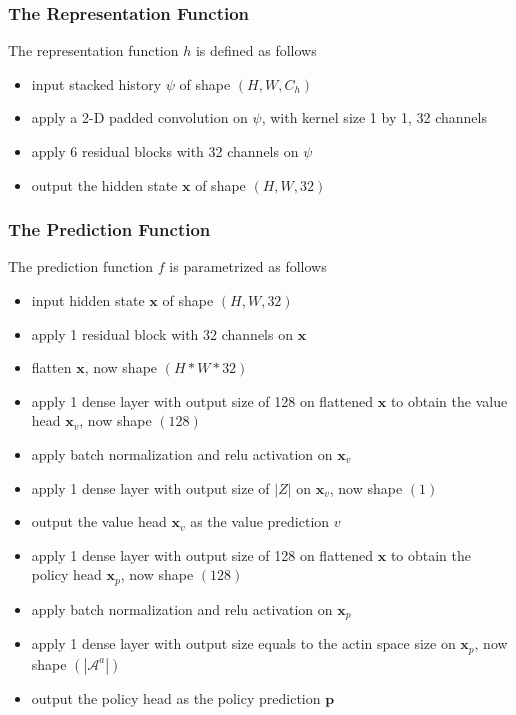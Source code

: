\subsubsection{The Representation Function}
The representation function $h$ is defined as follows
\begin{itemize}
    \item input stacked history $\psi$ of shape $(H, W, C_h)$
    \item apply a 2-D padded convolution on $\psi$, with kernel size 1 by 1, 32 channels
    \item apply 6 residual blocks with 32 channels on $\psi$
    \item output the hidden state $\mathbf{x}$ of shape $(H, W, 32)$
\end{itemize}

\subsubsection{The Prediction Function}
The prediction function $f$ is parametrized as follows
\begin{itemize}
    \item input hidden state $\mathbf{x}$ of shape $(H, W, 32)$
    \item apply 1 residual block with 32 channels on $\mathbf{x}$
    \item flatten $\mathbf{x}$, now shape $(H * W * 32)$
    \item apply 1 dense layer with output size of 128 on flattened $\mathbf{x}$ to obtain the value head $\mathbf{x}_v$, now shape $(128)$
    \item apply batch normalization and relu activation on $\mathbf{x}_v$
    \item apply 1 dense layer with output size of $|Z|$ on $\mathbf{x}_v$, now shape $(1)$
    \item output the value head $\mathbf{x}_v$ as the value prediction $v$
    \item apply 1 dense layer with output size of 128 on flattened $\mathbf{x}$ to obtain the policy head $\mathbf{x}_p$, now shape $(128)$
    \item apply batch normalization and relu activation on $\mathbf{x}_p$
    \item apply 1 dense layer with output size equals to the actin space size on $\mathbf{x}_p$, now shape $(|\mathcal{A}^a|)$
    \item output the policy head as the policy prediction $\mathbf{p}$
\end{itemize}

